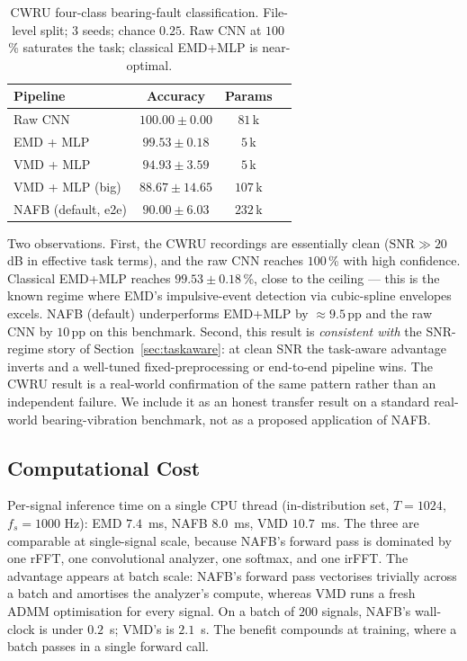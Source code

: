 \documentclass[journal]{IEEEtran}
\theoremstyle{remark}
\begin{document}
\begin{table}[t]
\centering
\caption{CWRU four-class bearing-fault classification. File-level
split; $3$ seeds; chance $0.25$. Raw CNN at $100$\,\% saturates the
task; classical EMD+MLP is near-optimal.}
\label{tab:cwru}
\setlength{\tabcolsep}{4pt}
\begin{tabular}{lccr}
\toprule
Pipeline                     & Accuracy              & Params   \\
\midrule
Raw CNN                      & $100.00 \pm 0.00$     & $81$\,k  \\
EMD + MLP                    & $99.53 \pm 0.18$      & $5$\,k   \\
VMD + MLP                    & $94.93 \pm 3.59$      & $5$\,k   \\
VMD + MLP (big)              & $88.67 \pm 14.65$     & $107$\,k \\
NAFB (default, e2e)          & $90.00 \pm 6.03$      & $232$\,k \\
\bottomrule
\end{tabular}
\end{table}

Two observations. First, the CWRU recordings are essentially clean
($\mathrm{SNR} \gg 20$\,dB in effective task terms), and the raw CNN
reaches $100$\,\% with high confidence. Classical EMD+MLP reaches
$99.53 \pm 0.18$\,\%, close to the ceiling --- this is the known
regime where EMD's impulsive-event detection via cubic-spline
envelopes excels. NAFB (default) underperforms EMD+MLP by
$\approx 9.5$\,pp and the raw CNN by $10$\,pp on this benchmark.
Second, this result is \emph{consistent with} the SNR-regime story
of Section~\ref{sec:taskaware}: at clean SNR the task-aware
advantage inverts and a well-tuned fixed-preprocessing or end-to-end
pipeline wins. The CWRU result is a real-world confirmation of the
same pattern rather than an independent failure. We include it as an
honest transfer result on a standard real-world bearing-vibration
benchmark, not as a proposed application of NAFB.

\subsection{Computational Cost}
\label{subsec:cost}

Per-signal inference time on a single CPU thread (in-distribution set,
$T = 1024$, $f_{s} = 1000$ Hz): EMD $7.4$~ms, NAFB $8.0$~ms, VMD
$10.7$~ms. The three are comparable at single-signal scale, because
NAFB's forward pass is dominated by one rFFT, one convolutional
analyzer, one softmax, and one irFFT. The advantage appears at batch
scale: NAFB's forward pass vectorises trivially across a batch and
amortises the analyzer's compute, whereas VMD runs a fresh ADMM
optimisation for every signal. On a batch of $200$ signals, NAFB's
wall-clock is under $0.2$~s; VMD's is $2.1$~s. The benefit compounds
at training, where a batch passes in a single forward call.
\end{document}
